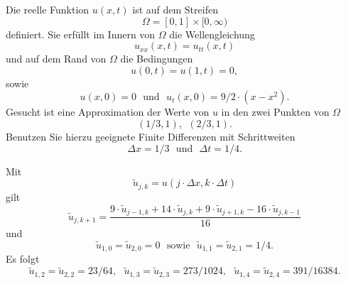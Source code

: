 Die reelle Funktion $u(x,t)$ ist auf dem Streifen
\[
\Omega = [0, 1] \times [0,\infty)
\]
definiert. Sie erfüllt im Innern von $\Omega$ die Wellengleichung
\[
u_{xx}(x,t) = u_{tt}(x,t)
\]
und auf dem Rand von $\Omega$ die Bedingungen
\[
u(0,t) = u(1,t) = 0,
\]
sowie
\[
u(x,0) = 0 \ \ \ \mbox{und} \ \ \ u_t(x,0) = 9/2 \cdot (x-x^2).
\]
Gesucht ist eine Approximation der Werte von $u$ in den zwei Punkten von $\Omega$
\[
(1/3, 1), \ \  (2/3, 1).
\]
Benutzen Sie hierzu geeignete Finite Differenzen mit Schrittweiten
\[
\Delta x = 1/3 \ \ \  \mbox{und} \ \  \ \Delta t = 1/4.
\]

\begin{loesung}
Mit
\[
\tilde u_{j,k} = u(j \cdot \Delta x, k \cdot \Delta t)
\]
gilt
\[
\tilde u_{j, k+1} = \frac{9 \cdot \tilde u_{j-1, k} + 14 \cdot \tilde u_{j, k} + 9 \cdot \tilde u_{j+1, k} - 16 \cdot \tilde u_{j, k-1}}{16}
\]
und
\[
\tilde u_{1,0} = \tilde u_{2,0} = 0 \ \ \ \mbox{sowie} \ \ \ \tilde u_{1,1} = \tilde u_{2,1} = 1/4.
\]
Es folgt
\[
\tilde u_{1,2} = \tilde u_{2,2} = 23/64, \ \ \ \tilde u_{1,3} = \tilde u_{2,3} = 273/1024, \ \ \ \tilde u_{1,4} = \tilde u_{2,4} = 391/16384.
\]
\end{loesung}

